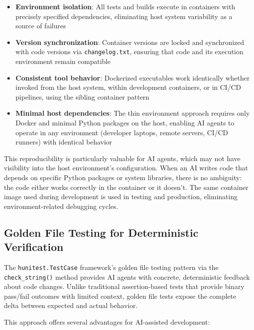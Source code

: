 \begin{itemize}
  \item \textbf{Environment isolation}: All tests and builds execute
    in containers with precisely specified dependencies, eliminating
    host system variability as a source of failures

  \item \textbf{Version synchronization}: Container versions are locked
    and synchronized with code versions via \texttt{changelog.txt},
    ensuring that code and its execution environment remain compatible

  \item \textbf{Consistent tool behavior}: Dockerized executables work
    identically whether invoked from the host system, within development
    containers, or in CI/CD pipelines, using the sibling container
    pattern

  \item \textbf{Minimal host dependencies}: The thin environment approach
    requires only Docker and minimal Python packages on the host, enabling
    AI agents to operate in any environment (developer laptops, remote
    servers, CI/CD runners) with identical behavior
\end{itemize}

This reproducibility is particularly valuable for AI agents, which may
not have visibility into the host environment's configuration. When an
AI writes code that depends on specific Python packages or system
libraries, there is no ambiguity: the code either works correctly in the
container or it doesn't. The same container image used during development
is used in testing and production, eliminating environment-related
debugging cycles.

\subsection{Golden File Testing for Deterministic Verification}

The \texttt{hunitest.TestCase} framework's golden file testing pattern
via the \texttt{check\_string()} method provides AI agents with concrete,
deterministic feedback about code changes. Unlike traditional assertion-based
tests that provide binary pass/fail outcomes with limited context, golden
file tests expose the complete delta between expected and actual behavior.

This approach offers several advantages for AI-assisted development:

